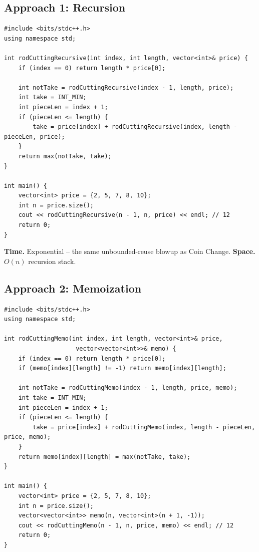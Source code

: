 \subsection*{Approach 1: Recursion}

\begin{lstlisting}
#include <bits/stdc++.h>
using namespace std;

int rodCuttingRecursive(int index, int length, vector<int>& price) {
    if (index == 0) return length * price[0];

    int notTake = rodCuttingRecursive(index - 1, length, price);
    int take = INT_MIN;
    int pieceLen = index + 1;
    if (pieceLen <= length) {
        take = price[index] + rodCuttingRecursive(index, length - pieceLen, price);
    }
    return max(notTake, take);
}

int main() {
    vector<int> price = {2, 5, 7, 8, 10};
    int n = price.size();
    cout << rodCuttingRecursive(n - 1, n, price) << endl; // 12
    return 0;
}
\end{lstlisting}

\begin{complexitybox}
\textbf{Time.} Exponential -- the same unbounded-reuse blowup as Coin
Change.
\textbf{Space.} $O(n)$ recursion stack.
\end{complexitybox}

\subsection*{Approach 2: Memoization}

\begin{lstlisting}
#include <bits/stdc++.h>
using namespace std;

int rodCuttingMemo(int index, int length, vector<int>& price,
                    vector<vector<int>>& memo) {
    if (index == 0) return length * price[0];
    if (memo[index][length] != -1) return memo[index][length];

    int notTake = rodCuttingMemo(index - 1, length, price, memo);
    int take = INT_MIN;
    int pieceLen = index + 1;
    if (pieceLen <= length) {
        take = price[index] + rodCuttingMemo(index, length - pieceLen, price, memo);
    }
    return memo[index][length] = max(notTake, take);
}

int main() {
    vector<int> price = {2, 5, 7, 8, 10};
    int n = price.size();
    vector<vector<int>> memo(n, vector<int>(n + 1, -1));
    cout << rodCuttingMemo(n - 1, n, price, memo) << endl; // 12
    return 0;
}
\end{lstlisting}

